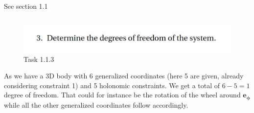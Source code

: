 \subsection{}
See section 1.1
\subsection{}

\begin{figure}[ht]
    \centering
    \includegraphics[scale=0.4]{images/1.1.3.png}
    \caption{Task 1.1.3}
    \label{fig:task1.1.3}
\end{figure}

\noindent As we have a 3D body with 6 generalized coordinates (here 5 are given, already considering constraint 1) and 5 holonomic constraints. We get a total of $6 - 5 = 1$ degree of freedom. That could for instance be the rotation of the wheel around $\boldsymbol{e_\phi}$ while all the other generalized coordinates follow accordingly.

